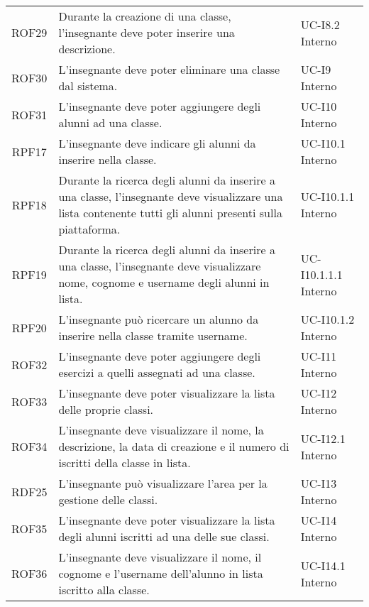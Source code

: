 \begin{tabularx}{\textwidth}{| c | p{10cm} | X |}
		ROF29 & Durante la creazione di una classe, l'insegnante deve poter inserire una descrizione. & UC-I8.2 \newline Interno\\
		ROF30 & L'insegnante deve poter eliminare una classe dal sistema. & UC-I9 \newline Interno\\
		ROF31 & L'insegnante deve poter aggiungere degli alunni ad una classe. & UC-I10 \newline Interno\\
		RPF17 & L'insegnante deve indicare gli alunni da inserire nella classe. & UC-I10.1 \newline Interno\\
		RPF18 & Durante la ricerca degli alunni da inserire a una classe, l'insegnante deve visualizzare una lista contenente tutti gli alunni presenti sulla piattaforma. & UC-I10.1.1 \newline Interno\\
		RPF19 & Durante la ricerca degli alunni da inserire a una classe, l'insegnante deve visualizzare nome, cognome e username degli alunni in lista. & UC-I10.1.1.1 \newline Interno\\
		RPF20 & L'insegnante può ricercare un alunno da inserire nella classe tramite username. & UC-I10.1.2 \newline Interno\\
		ROF32 & L'insegnante deve poter aggiungere degli esercizi a quelli assegnati ad una classe. & UC-I11 \newline Interno\\
		ROF33 & L'insegnante deve poter visualizzare la lista delle proprie classi. & UC-I12 \newline Interno\\
		ROF34 & L'insegnante deve visualizzare il nome, la descrizione, la data di creazione e il numero di iscritti della classe in lista. & UC-I12.1 \newline Interno\\
		RDF25 & L'insegnante può visualizzare l'area per la gestione delle classi. & UC-I13 \newline Interno\\
		ROF35 & L'insegnante deve poter visualizzare la lista degli alunni iscritti ad una delle sue classi. & UC-I14 \newline Interno\\		
		ROF36 & L'insegnante deve visualizzare il nome, il cognome e l'username dell'alunno in lista iscritto alla classe. & UC-I14.1 \newline Interno\\

\end{tabularx}
